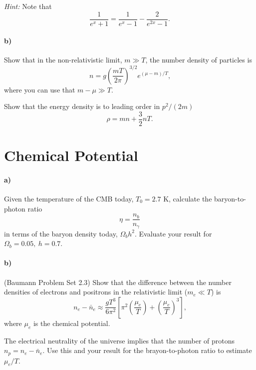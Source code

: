 \documentclass[12pt]{article}
\begin{document}
\emph{Hint:} Note that
\begin{equation}
    \frac{1}{e^x + 1} = \frac{1}{e^x - 1} - \frac{2}{e^{2x} - 1} \text{.}
\end{equation}

\paragraph{b)} Show that in the non-relativistic limit, $m \gg T$, the number
density of particles is
\begin{equation}
    n = g \left(\frac{m T}{2 \pi}\right)^{3/2} e^{(\mu-m)/T} \text{,}
\label{eq:nr-density}
\end{equation}
where you can use that $m - \mu \gg T$.

Show that the energy density is to leading order in $p^2 / (2m)$
\begin{equation}
    \rho = m n + \frac{3}{2} n T \text{.}
\end{equation}


\section{Chemical Potential}

\paragraph{a)} Given the temperature of the CMB today, $T_0 = 2.7$ K, calculate
the baryon-to-photon ratio
\begin{equation}
    \eta = \frac{n_b}{n_\gamma}
\end{equation}
in terms of the baryon density today, $\Omega_b h^2$. Evaluate your result for
$\Omega_b=0.05,\ h=0.7$.

\paragraph{b)} (Baumann Problem Set 2.3)
Show that the difference between the number densities of electrons and positrons
in the relativistic limit ($m_e \ll T$) is
\begin{equation}
    n_e - \bar{n}_e \approx \frac{gT^3}{6 \pi^2}\left[\pi^2
    \left(\frac{\mu_e}{T}\right) + \left(\frac{\mu_e}{T}\right)^3
    \right] \text{,}
\end{equation}
where $\mu_e$ is the chemical potential.

The electrical neutrality of the universe implies that the number of protons
$n_p = n_e - \bar{n}_e$. Use this and your result for the brayon-to-photon ratio
to estimate $\mu_e/T$.
\end{document}
